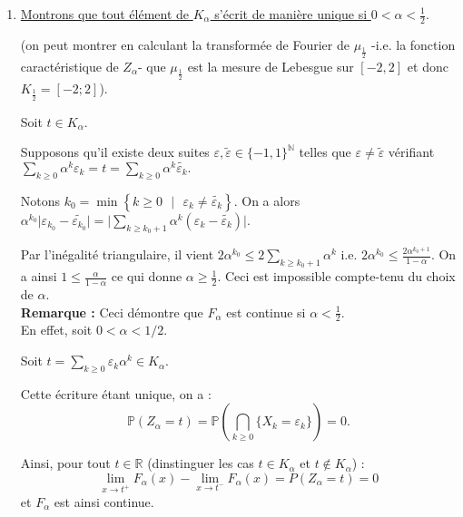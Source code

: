 \begin{enumerate}
\item \underline{Montrons que tout élément de $K_{\alpha}$ s'écrit de manière unique si $0<\alpha<\frac{1}{2}.$}
    
(on peut montrer en calculant la transformée de Fourier de $\mu_{\frac{1}{2}}$ -i.e. la fonction caractéristique de $Z_{\alpha}$- que $\mu_{\frac{1}{2}}$ est la mesure de Lebesgue sur $[-2,2]$ et donc $K_{\frac{1}{2}}=[-2;2]$).

Soit $t\in K_{\alpha}.$ 

Supposons qu'il existe deux suites $\varepsilon,\tilde{\varepsilon}\in\{-1,1\}^\mathbb{N}$ telles que $\varepsilon\neq \tilde{\varepsilon}$ vérifiant $\displaystyle \sum_{k\geq 0}\alpha^{k}\varepsilon_{k}=t=\sum_{k\geq 0}\alpha^{k}\tilde{\varepsilon_{k}}.$

Notons $k_{0}=\min\left\{ k\geq 0\mbox{ }|\mbox{ } \varepsilon_{k}\neq \tilde{\varepsilon_{k}} \right\}.$ On a alors $\displaystyle \alpha^{k_{0}}\vert \varepsilon_{k_{0}}-\tilde{\varepsilon_{k_{0}}}\vert =\big\vert \sum_{k\geq k_{0}+1}\alpha^{k}\left(\varepsilon_{k}-\tilde{\varepsilon_{k}}\right)\big\vert.$

Par l'inégalité triangulaire, il vient $\displaystyle 2\alpha^{k_{0}}\leq 2\sum_{k\geq k_{0}+1}\alpha^{k} \mbox{ i.e. } 2\alpha^{k_{0}}\leq \frac{2\alpha^{k_{0}+1}}{1-\alpha}.$
On a ainsi $\displaystyle 1\leq \frac{\alpha}{1-\alpha}$ ce qui donne $\alpha\geq \frac{1}{2}.$ Ceci est impossible compte-tenu du choix de $\alpha.$\\

\textbf{Remarque :} Ceci démontre que $F_{\alpha}$ est continue si $\alpha<\frac{1}{2}.$\\

En effet, soit $0<\alpha<1/2.$ 

Soit $t=\sum\limits_{k\geq 0}\varepsilon_{k}\alpha^{k}\in K_{\alpha}.$

Cette écriture étant unique, on a : $$\mathbb{P}(Z_{\alpha}=t)=\mathbb{P}\left( \bigcap_{k\geq 0}\{X_{k}=\varepsilon_{k}\} \right)=0.$$

Ainsi, pour tout $t\in\mathbb{R}$ (dinstinguer les cas $t\in K_{\alpha}$ et $t\notin K_{\alpha}$) : $$\lim_{x\rightarrow t^{+}}F_{\alpha}(x)-\lim_{x\rightarrow t^{-}}F_{\alpha}(x)=P(Z_{\alpha}=t)=0$$ et $F_{\alpha}$ est ainsi continue.\\ 




\end{enumerate}
